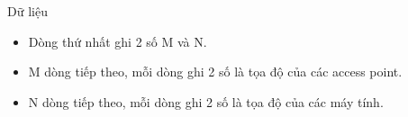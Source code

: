 Dữ liệu
\begin{itemize}
	\item Dòng thứ nhất ghi 2 số M và N.
	\item M dòng tiếp theo, mỗi dòng ghi 2 số là tọa độ của các access point.
	\item N dòng tiếp theo, mỗi dòng ghi 2 số là tọa độ của các máy tính.
\end{itemize}